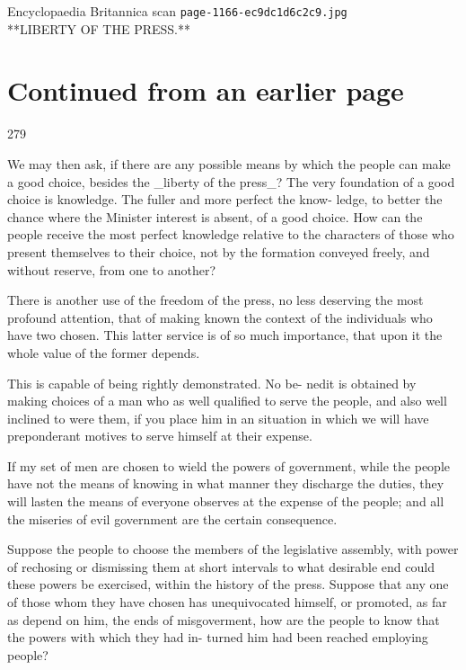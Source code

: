 \documentclass{article}
\begin{document}
\begin{center}
{\Large Encyclopaedia Britannica scan \texttt{page-1166-ec9dc1d6c2c9.jpg}}\\[0.5em]
**LIBERTY OF THE PRESS.**
\end{center}
\section*{Continued from an earlier page}
279

We may then ask, if there are any possible means by which the people can make a good choice, besides the \_liberty of the press\_? The very foundation of a good choice is knowledge. The fuller and more perfect the know- ledge, to better the chance where the Minister interest is absent, of a good choice. How can the people receive the most perfect knowledge relative to the characters of those who present themselves to their choice, not by the formation conveyed freely, and without reserve, from one to another?

There is another use of the freedom of the press, no less deserving the most profound attention, that of making known the context of the individuals who have two chosen. This latter service is of so much importance, that upon it the whole value of the former depends.

This is capable of being rightly demonstrated. No be- nedit is obtained by making choices of a man who as well qualified to serve the people, and also well inclined to were them, if you place him in an situation in which we will have preponderant motives to serve himself at their expense.

If my set of men are chosen to wield the powers of government, while the people have not the means of knowing in what manner they discharge the duties, they will lasten the means of everyone observes at the expense of the people; and all the miseries of evil government are the certain consequence.

Suppose the people to choose the members of the legislative assembly, with power of rechosing or dismissing them at short intervals to what desirable end could these powers be exercised, within the history of the press. Suppose that any one of those whom they have chosen has unequivocated himself, or promoted, as far as depend on him, the ends of misgoverment, how are the people to know that the powers with which they had in- turned him had been reached employing people?
\end{document}
